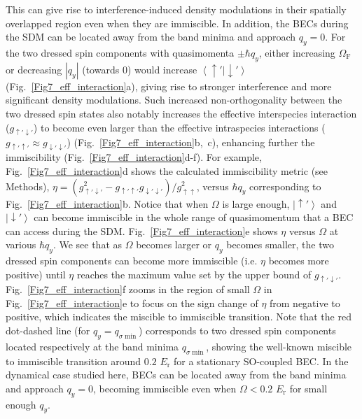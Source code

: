 \documentclass[showpacs,preprintnumbers,amsmath,amssymb, superscriptaddress, aps, reprint]{revtex4-1}
\def\E_r{E_{\text{r}}}
\def\OmegaF{\Omega_{\text{F}}}
\begin{document}
{{{\begin{figure}[t]
\label{Fig8_energy}
\end{figure}
This can give rise to interference-induced density modulations in their spatially overlapped region even when they are immiscible. In addition, the BECs during the SDM can be located away from the band minima and approach $q_y=0$. For the two dressed spin components with quasimomenta $\pm\hbar q_y$, either increasing $\OmegaF$ or decreasing $|q_y|$ (towards $0$) would increase $\left\langle\uparrow'|\downarrow'\right\rangle$ ({Fig.~{\ref{Fig7_eff_interaction}}a}), giving rise to stronger interference and more significant density modulations. 
Such increased non-orthogonality between the two dressed spin states also notably increases the effective interspecies interaction ($g_{\uparrow'\downarrow'}$) to become even larger than the effective intraspecies interactions ($g_{\uparrow'\uparrow'}\approx g_{\downarrow'\downarrow'}$) ({Fig.~{\ref{Fig7_eff_interaction}}b,~c}), enhancing further the immiscibility ({Fig.~{\ref{Fig7_eff_interaction}}d-f}). 
{For example,
Fig.~{\ref{Fig7_eff_interaction}}d shows the calculated immiscibility metric (see Methods), $\eta = \left( {g_{ \uparrow \prime \downarrow \prime }^2 - g_{ \uparrow \prime \uparrow \prime }g_{ \downarrow \prime \downarrow \prime }} \right){\mathrm{/}}g_{ \uparrow \uparrow }^2$, versus $\hbar q_y$  corresponding to Fig.~{\ref{Fig7_eff_interaction}}b. 
Notice that when $\Omega$ is large enough, $\left|\uparrow'\right\rangle$ and $\left|\downarrow'\right\rangle$ can become immiscible in the whole range of quasimomentum that a BEC can access during the SDM.
Fig.~{\ref{Fig7_eff_interaction}}e shows $\eta$ versus $\Omega$ at various $\hbar q_y$. We see that as $\Omega$ becomes larger or $q_y$ becomes smaller, the two dressed spin components can become more immiscible (i.e. $\eta$ becomes more positive) until $\eta$ reaches the maximum value set by the upper bound of $g_{\uparrow'\downarrow'}$. Fig.~{\ref{Fig7_eff_interaction}}f zooms in the region of small $\Omega$ in Fig.~{\ref{Fig7_eff_interaction}}e to focus on the sign change of $\eta$ from negative to positive, which indicates the miscible to immiscible transition. Note that the red dot-dashed line (for $q_y=q_{\sigma\min}$) corresponds to two dressed spin components located respectively at the band minima $q_{\sigma\min}$, showing the well-known miscible to immiscible transition around $0.2$ $\E_r$ for a stationary SO-coupled BEC. In the dynamical case studied here, BECs can be located away from the band minima and approach $q_y=0$, becoming immiscible even when $\Omega<0.2$ $\E_r$ for small enough $q_y$.}

}}}
\end{document}
